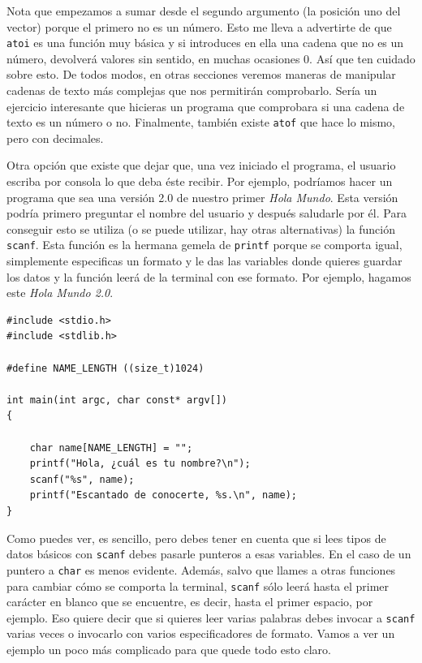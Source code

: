 \documentclass[a4paper]{article}
\begin{document}
Nota que empezamos a sumar desde el segundo argumento (la posición uno del
vector) porque el primero no es un número. Esto me lleva a advertirte de que
\verb!atoi! es una función muy básica y si introduces en ella una cadena que no
es un número, devolverá valores sin sentido, en muchas ocasiones 0. Así
que ten cuidado sobre esto. De todos modos, en otras secciones veremos maneras
de manipular cadenas de texto más complejas que nos permitirán comprobarlo.
Sería un ejercicio interesante que hicieras un programa que comprobara si una
cadena de texto es un número o no. Finalmente, también existe \verb!atof! que
hace lo mismo, pero con decimales.

Otra opción que existe que dejar que, una vez iniciado el programa, el usuario
escriba por consola lo que deba éste recibir. Por ejemplo, podríamos hacer un
programa que sea una versión 2.0 de nuestro primer \emph{Hola Mundo}. Esta
versión podría primero preguntar el nombre del usuario y después saludarle por
él. Para conseguir esto se utiliza (o se puede utilizar, hay otras alternativas)
la función \verb!scanf!. Esta función es la hermana gemela de \verb!printf!
porque se comporta igual, simplemente especificas un formato y le das las
variables donde quieres guardar los datos y la función leerá de la terminal
con ese formato. Por ejemplo, hagamos este \emph{Hola Mundo 2.0}.

\noindent
\begin{minipage}[H]{\linewidth}
\mbox{}
\begin{lstlisting}[style=C,
caption={Ejemplo básico de \texttt{scanf}},
label={lst:basicScanf}]
#include <stdio.h>
#include <stdlib.h>

#define NAME_LENGTH ((size_t)1024)

int main(int argc, char const* argv[])
{

    char name[NAME_LENGTH] = "";
    printf("Hola, ¿cuál es tu nombre?\n");
    scanf("%s", name);
    printf("Escantado de conocerte, %s.\n", name);
}
\end{lstlisting}
\end{minipage}

Como puedes ver, es sencillo, pero debes tener en cuenta que si lees tipos
de datos básicos con \verb!scanf! debes pasarle punteros a esas variables. En
el caso de un puntero a \verb!char! es menos evidente. Además, salvo que llames
a otras funciones para cambiar cómo se comporta la terminal, \verb!scanf! sólo
leerá hasta el primer carácter en blanco que se encuentre, es decir, hasta el
primer espacio, por ejemplo. Eso quiere decir que si quieres leer varias
palabras debes invocar a \verb!scanf! varias veces o invocarlo con varios
especificadores de formato. Vamos a ver un ejemplo un poco más complicado para
que quede todo esto claro.
\end{document}
